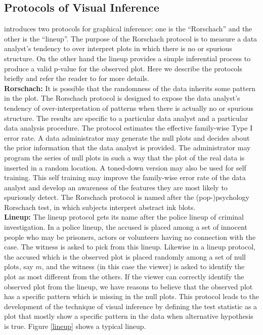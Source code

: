 \documentclass[12]{report}
\begin{document}
\subsection{Protocols of Visual Inference} \label{sec:protocol} \citet{buja:2009} introduces two protocols for graphical inference: one is the  ``Rorschach'' and the other is the ``lineup''. The purpose of the Rorschach protocol is to measure a data analyst's tendency to over interpret plots in which there is no or spurious structure. On the other hand the lineup provides a simple inferential process to produce a valid p-value for the observed plot. Here we describe the protocols briefly and refer the reader to \citet{buja:2009} for more details. \\

{\bf Rorschach:} It is possible that the randomness of the data inherits some pattern in the plot. The Rorschach protocol is designed to expose the data analyst's tendency of over-interpretation of patterns when there is actually no or spurious structure. The results are specific to a particular data analyst and a particular data analysis procedure. The protocol estimates the effective family-wise Type I error rate. A data administrator may generate the null plots and decides about the prior information that the data analyst is provided. The administrator may program the series of null plots in such a way that the plot of the real data is inserted in a random location. A toned-down version may also be used for self training. This self training may improve the family-wise error rate of the data analyst and develop an awareness of the features they are most likely to spuriously detect. 
The Rorschach protocol is named after the (pop-)psychology Rorschach test, in which subjects interpret abstract ink blots. \\

{\bf Lineup:} The lineup protocol gets its name after the police lineup of criminal investigation. In a police lineup, the accused is placed among a set of innocent people who may be prisoners, actors or volunteers having no connection with the case. The witness is asked to pick from this lineup. Likewise in a lineup protocol, the accused which is the observed plot is placed randomly among a set of null plots, say $m$, and the witness (in this case the viewer) is asked to identify the plot as most different from the others. If the viewer  can correctly identify the observed plot from the lineup, we have reasons to believe that the observed plot has a specific pattern which is missing in the null plots. This protocol leads to the development of the technique of visual inference by defining the test statistic as a plot that mostly show a specific pattern in the data when alternative hypothesis is true. Figure \ref{lineup} shows a typical lineup. \\
\end{document}
